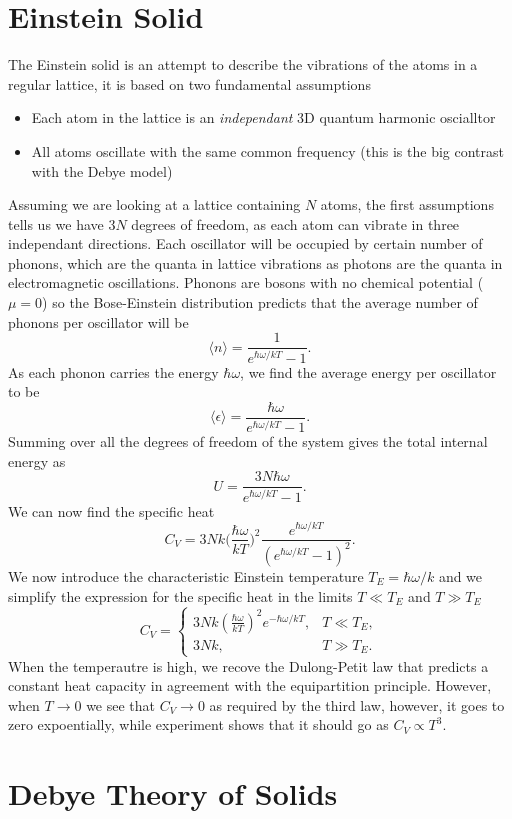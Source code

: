 \documentclass[a4paper, 11pt, notitlepage, english]{article}
\newcommand{\eps}{\epsilon}
\begin{document}
\section*{Einstein Solid}

The Einstein solid is an attempt to describe the vibrations of the atoms in a regular lattice, it is based on two fundamental assumptions
\begin{itemize}
	\item Each atom in the lattice is an \emph{independant} 3D quantum harmonic oscialltor
	\item All atoms oscillate with the same common frequency (this is the big contrast with the Debye model) 
\end{itemize}

Assuming we are looking at a lattice containing $N$ atoms, the first assumptions tells us we have $3N$ degrees of freedom, as each atom can vibrate in three independant directions. Each oscillator will be occupied by certain number of phonons, which are the quanta in lattice vibrations as photons are the quanta in electromagnetic oscillations. Phonons are bosons with no chemical potential ($\mu = 0$) so the Bose-Einstein distribution predicts that the average number of phonons per oscillator will be
$$\langle n \rangle = \frac{1}{e^{\hbar \omega/kT} - 1}.$$
As each phonon carries the energy $\hbar \omega$, we find the average energy per oscillator to be
$$\langle \eps \rangle = \frac{\hbar \omega}{e^{\hbar \omega/kT} - 1}.$$
Summing over all the degrees of freedom of the system gives the total internal energy as
$$U = \frac{3N\hbar \omega}{e^{\hbar \omega/kT} - 1}.$$
We can now find the specific heat
$$C_V = 3Nk \bigg(\frac{\hbar \omega}{kT}\bigg)^2 \frac{e^{\hbar \omega/kT}}{(e^{\hbar \omega/kT}-1)^2}.$$
We now introduce the characteristic Einstein temperature $T_E = \hbar \omega/k$ and we simplify the expression for the specific heat in the limits $T \ll T_E$ and $T \gg T_E$
$$C_V = \begin{cases}
	3Nk (\frac{\hbar\omega}{kT})^2 e^{-\hbar\omega/kT}, & T \ll T_E, \\
	3Nk, & T \gg T_E.
\end{cases}$$
When the temperautre is high, we recove the Dulong-Petit law that predicts a constant heat capacity in agreement with the equipartition principle. However, when $T\to 0$ we see that $C_V \to 0$ as required by the third law, however, it goes to zero expoentially, while experiment shows that it should go as $C_V \propto T^3$.


\section*{Debye Theory of Solids}
\end{document}
